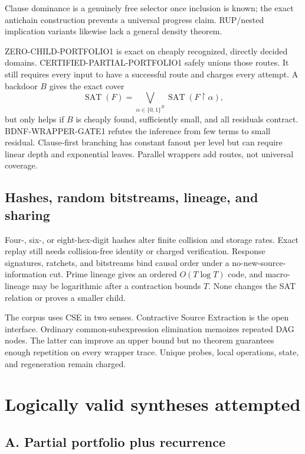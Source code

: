 \documentclass[11pt]{article}
\begin{document}
Clause dominance is a genuinely free selector once inclusion is known; the exact antichain construction prevents a universal progress claim.  RUP/nested implication variants likewise lack a general density theorem.

ZERO-CHILD-PORTFOLIO1 is exact on cheaply recognized, directly decided domains.  CERTIFIED-PARTIAL-PORTFOLIO1 safely unions those routes.  It still requires every input to have a successful route and charges every attempt.  A backdoor $B$ gives the exact cover
\[
  \operatorname{SAT}(F)=\bigvee_{\alpha\in\{0,1\}^{B}}
  \operatorname{SAT}(F\!\upharpoonright\!\alpha),
\]
but only helps if $B$ is cheaply found, sufficiently small, and all residuals contract.  BDNF-WRAPPER-GATE1 refutes the inference from few terms to small residual.  Clause-first branching has constant fanout per level but can require linear depth and exponential leaves.  Parallel wrappers add routes, not universal coverage.

\subsection{Hashes, random bitstreams, lineage, and sharing}

Four-, six-, or eight-hex-digit hashes alter finite collision and storage rates.  Exact replay still needs collision-free identity or charged verification.  Response signatures, ratchets, and bitstreams bind causal order under a no-new-source-information cut.  Prime lineage gives an ordered $O(T\log T)$ code, and macro-lineage may be logarithmic after a contraction bounds $T$.  None changes the SAT relation or proves a smaller child.

The corpus uses CSE in two senses.  Contractive Source Extraction is the open interface.  Ordinary common-subexpression elimination memoizes repeated DAG nodes.  The latter can improve an upper bound but no theorem guarantees enough repetition on every wrapper trace.  Unique probes, local operations, state, and regeneration remain charged.

\section{Logically valid syntheses attempted}

\subsection{A. Partial portfolio plus recurrence}
\end{document}
